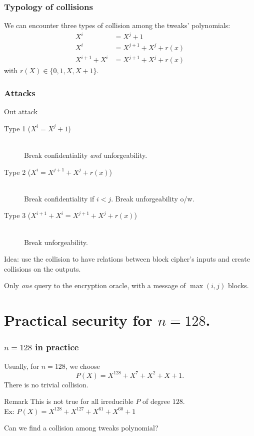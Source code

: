 \documentclass{beamer}
\begin{document}
	\begin{frame}
		\frametitle{Typology of collisions}

		We can encounter three types of collision among the tweaks' polynomials:
		\begin{align}
			X^i &= X^j + 1 \\
			X^i & = X^{j+1} + X^j + r(x) \\
			X^{i+1} + X^i & = X^{j+1} + X^j + r(x)
		\end{align}
		with $r(X) \in \{0, 1, X, X+1\}$.
	
	\end{frame}

	\begin{frame}
		\frametitle{Attacks}

		\begin{block}{Out attack}
		\begin{description}
			\item[Type 1 ($X^i = X^j + 1$)] \ \\
			Break confidentiality \emph{and} unforgeability.   
			\item[Type 2 ($X^i  = X^{j+1} + X^j + r(x)$)] \ \\ Break confidentiality if $i < j$. Break unforgeability o/w.   
			\item[Type 3 ($X^{i+1} + X^i  = X^{j+1} + X^j + r(x)$)]  \ \\
			Break unforgeability.   
		\end{description}
		\end{block}

		Idea: use the collision to have relations between block cipher's inputs and create collisions on the outputs.
		
		Only \emph{one} query to the encryption oracle, with a message of $\max(i,j)$ blocks.
	\end{frame}



\section{Practical security for $n = 128$.} %
\label{sec:practical_security_for_n_128}


	\begin{frame}
		\frametitle{$n = 128$ in practice}

		Usually, for $n = 128$, we choose
		\[
			P(X) = X^{128}+X^{7}+X^{2}+X+1.
		\]
		There is no trivial collision. 
		\begin{block}{Remark}
			This is not true for all irreducible $P$ of degree $128$.\\
			Ex: $P(X)=X^{128}+X^{127}+X^{61}+X^{60}+1$
		\end{block}
		
		Can we find a collision among tweaks polynomial?
	\end{frame}
\end{document}
